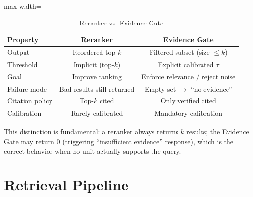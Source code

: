 \begin{table}[htbp]
\centering
\caption{Reranker vs. Evidence Gate}
\label{tab:retrieval:reranker-vs-gate}
\begin{adjustbox}{max width=\textwidth}
\begin{tabular}{lcc}
\toprule
\textbf{Property} & \textbf{Reranker} & \textbf{Evidence Gate} \\
\midrule
Output & Reordered top-$k$ & Filtered subset (size $\leq k$) \\
Threshold & Implicit (top-$k$) & Explicit calibrated $\tau$ \\
Goal & Improve ranking & Enforce relevance / reject noise \\
Failure mode & Bad results still returned & Empty set $\to$ ``no evidence'' \\
Citation policy & Top-$k$ cited & Only verified cited \\
Calibration & Rarely calibrated & Mandatory calibration \\
\bottomrule
\end{tabular}
\end{adjustbox}
\end{table}

This distinction is fundamental: a reranker always returns $k$ results; the Evidence Gate may return $0$ (triggering ``insufficient evidence'' response), which is the correct behavior when no unit actually supports the query.

\section{Retrieval Pipeline}
\label{sec:retrieval:pipeline}

